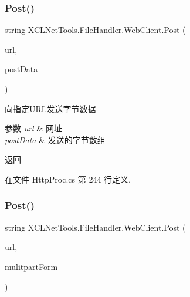 \subsubsection{\texorpdfstring{Post()}{Post()}\hspace{0.1cm}{\footnotesize\ttfamily [2/3]}}
{\footnotesize\ttfamily string X\+C\+L\+Net\+Tools.\+File\+Handler.\+Web\+Client.\+Post (\begin{DoxyParamCaption}\item[{string}]{url,  }\item[{byte \mbox{[}$\,$\mbox{]}}]{post\+Data }\end{DoxyParamCaption})}



向指定\+U\+R\+L发送字节数据 


\begin{DoxyParams}{参数}
{\em url} & 网址\\
\hline
{\em post\+Data} & 发送的字节数组\\
\hline
\end{DoxyParams}
\begin{DoxyReturn}{返回}

\end{DoxyReturn}


在文件 Http\+Proc.\+cs 第 244 行定义.

\mbox{\label{class_x_c_l_net_tools_1_1_file_handler_1_1_web_client_ab1556a7a601a8425c7d6bcecb09d6cf2}} 
\subsubsection{\texorpdfstring{Post()}{Post()}\hspace{0.1cm}{\footnotesize\ttfamily [3/3]}}
{\footnotesize\ttfamily string X\+C\+L\+Net\+Tools.\+File\+Handler.\+Web\+Client.\+Post (\begin{DoxyParamCaption}\item[{string}]{url,  }\item[{\hyperlink{class_x_c_l_net_tools_1_1_file_handler_1_1_multipart_form}{Multipart\+Form}}]{mulitpart\+Form }\end{DoxyParamCaption})}



